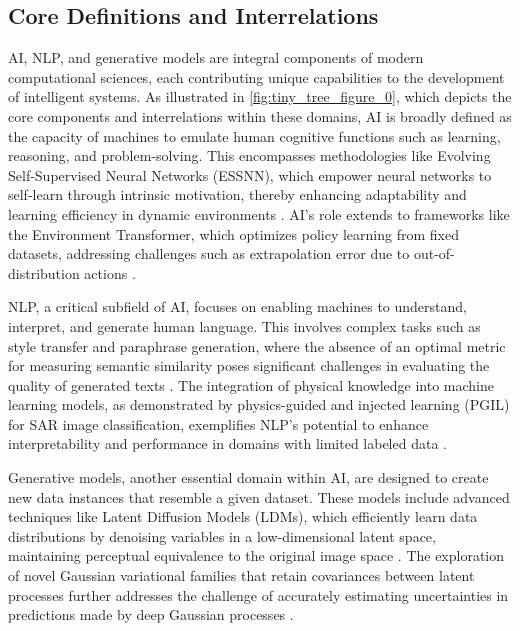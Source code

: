 







\subsection{Core Definitions and Interrelations} \label{subsec:Core Definitions and Interrelations}

AI, NLP, and generative models are integral components of modern computational sciences, each contributing unique capabilities to the development of intelligent systems. As illustrated in \autoref{fig:tiny_tree_figure_0}, which depicts the core components and interrelations within these domains, AI is broadly defined as the capacity of machines to emulate human cognitive functions such as learning, reasoning, and problem-solving. This encompasses methodologies like Evolving Self-Supervised Neural Networks (ESSNN), which empower neural networks to self-learn through intrinsic motivation, thereby enhancing adaptability and learning efficiency in dynamic environments \cite{le2019evolvingselfsupervisedneuralnetworks}. AI's role extends to frameworks like the Environment Transformer, which optimizes policy learning from fixed datasets, addressing challenges such as extrapolation error due to out-of-distribution actions \cite{wang2023environmenttransformerpolicyoptimization}.

NLP, a critical subfield of AI, focuses on enabling machines to understand, interpret, and generate human language. This involves complex tasks such as style transfer and paraphrase generation, where the absence of an optimal metric for measuring semantic similarity poses significant challenges in evaluating the quality of generated texts \cite{yamshchikov2020styletransferparaphraselookingsensible}. The integration of physical knowledge into machine learning models, as demonstrated by physics-guided and injected learning (PGIL) for SAR image classification, exemplifies NLP's potential to enhance interpretability and performance in domains with limited labeled data \cite{huang2022physicallyexplainablecnnsar}.

Generative models, another essential domain within AI, are designed to create new data instances that resemble a given dataset. These models include advanced techniques like Latent Diffusion Models (LDMs), which efficiently learn data distributions by denoising variables in a low-dimensional latent space, maintaining perceptual equivalence to the original image space \cite{rombach2022high}. The exploration of novel Gaussian variational families that retain covariances between latent processes further addresses the challenge of accurately estimating uncertainties in predictions made by deep Gaussian processes \cite{lindinger2020meanfieldstructureddeepgaussian}.

